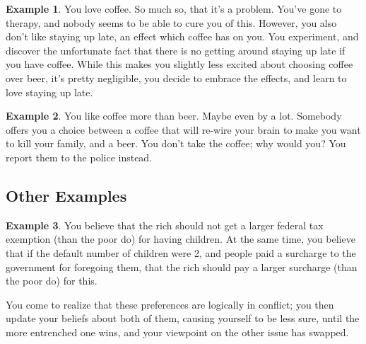 \documentclass{article}
\theoremstyle{plain}
\theoremstyle{definition}
\newtheorem{example}{Example}[section]
\theoremstyle{remark}
\begin{document}
	\begin{example}
		You love coffee. So much so, that it's a problem. You've gone to therapy, and nobody seems to be able to cure you of this. However, you also don't like staying up late, an effect which coffee has on you. You experiment, and discover the unfortunate fact that there is no getting around staying up late if you have coffee. While this makes you slightly less excited about choosing coffee over beer, it's pretty negligible, you decide to embrace the effects, and learn to love staying up late.
	\end{example}

	\begin{example}
		You like coffee more than beer. Maybe even by a lot. Somebody offers you a choice between a coffee that will re-wire your brain to make you want to kill your family, and a beer. You don't take the coffee; why would you? You report them to the police instead.
	\end{example}

	\subsection{Other Examples}
	\begin{example}
		You believe that the rich should not get a larger federal tax exemption (than the poor do) for having children.
		At the same time, you believe that if the default number of children were 2, and people paid a surcharge to the government for foregoing them, that the rich should pay a larger surcharge (than the poor do) for this.
		
		You come to realize that these preferences are logically in conflict; you then update your beliefs about both of them, causing yourself to be less sure, until the more entrenched one wins, and your viewpoint on the other issue has swapped.
	\end{example}
\end{document}

